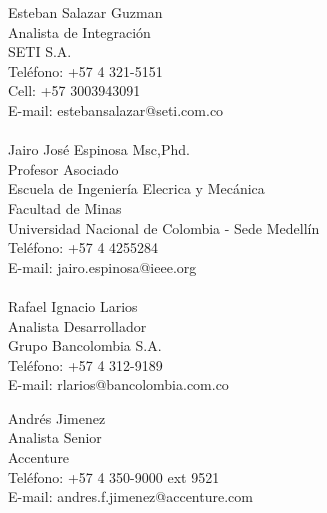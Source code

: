 \begin{resume}
 Esteban Salazar Guzman\\
 Analista de Integraci\'{o}n  \\
 SETI S.A. \\
 Tel\'{e}fono: +57 4 321-5151 \\
 Cell: +57 3003943091 \\ 
 E-mail: estebansalazar@seti.com.co\\
 \\  
 Jairo Jos\'{e} Espinosa Msc,Phd.\\
 Profesor Asociado \\
 Escuela de Ingenier\'{i}a Elecrica y Mec\'{a}nica \\
 Facultad de Minas \\
 Universidad Nacional de Colombia - Sede  Medell\'{i}n\\
 Tel\'{e}fono: +57 4 4255284 \\
 E-mail: jairo.espinosa@ieee.org\\
 \\  
 Rafael Ignacio Larios\\
 Analista Desarrollador \\
 Grupo Bancolombia S.A. \\
 Tel\'{e}fono: +57 4 312-9189  \\
 E-mail: rlarios@bancolombia.com.co 

 Andr\'{e}s Jimenez\\
 Analista Senior \\
 Accenture \\
 Tel\'{e}fono: +57 4 350-9000 ext 9521  \\
 E-mail: andres.f.jimenez@accenture.com 
\end{resume}

